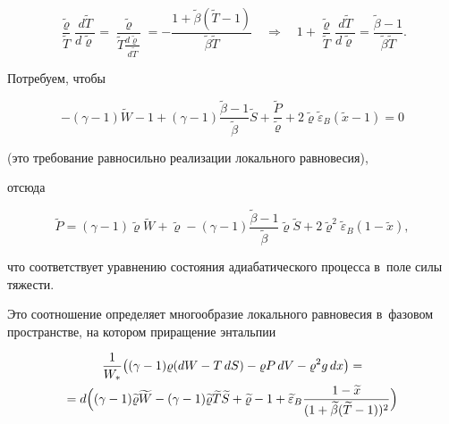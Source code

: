 $$

\frac{\widetilde{\varrho}}{\widetilde{T}}\frac{d\widetilde{T}}{d\widetilde{\varrho}}=

\frac{\widetilde{\varrho}}{\widetilde{T}\frac{d\widetilde{\varrho}}{d\widetilde{T}}}=

-\frac{1+\widetilde{\beta}(\widetilde{T}-1)}{\widetilde{\beta}\widetilde{T}}\quad 

\Rightarrow \quad 

1+\frac{\widetilde{\varrho}}{\widetilde{T}}\frac{d\widetilde{T}}{d\widetilde{\varrho}}=\frac{\widetilde{\beta}-1}{\widetilde{\beta}\widetilde{T}}.

$$

Потребуем, чтобы

\begin{equation}

-(\gamma-1)\widetilde{W}-1+(\gamma-1)\frac{\widetilde{\beta}-1}{\widetilde{\beta}}\widetilde{S} +\frac{\widetilde{P}}{\widetilde{\varrho}}+2\widetilde{\varrho} \widetilde{\varepsilon}_B

(\widetilde{x }-1 )=0

\label{lukashev:loeeq}

\end{equation}

(это требование равносильно реализации локального равновесия), 

отсюда

\begin{equation}

\widetilde{P}=(\gamma-1)\widetilde{\varrho}\widetilde{W}+\widetilde{\varrho}-

(\gamma-1)\frac{\widetilde{\beta}-1}{\widetilde{\beta}} \widetilde{\varrho}

\widetilde{S} +2\widetilde{\varrho}^2 \widetilde{\varepsilon}_B (1-\widetilde{x}),

\label{lukashev:2}

\end{equation}

что соответствует уравнению состояния адиабатического процесса в~поле силы тяжести.

Это соотношение определяет многообразие локального равновесия в~фазовом пространстве, на котором приращение энтальпии

\begin{multline}

\label{lukashev:1H}

\frac1{W_*}

\bigl(

(\gamma-1)\varrho (dW-T\,dS)-\varrho P \,dV-\varrho^2 g \,dx

\bigr)=\\

=d\Bigl(

(\gamma-1)\widetilde{\varrho}\widetilde{W}-

(\gamma-1)\widetilde{\varrho} \widetilde{T}\widetilde{S}+

\widetilde{\varrho}-1+\widetilde{\varepsilon}_B \frac{1- \widetilde{x}}{(1+\widetilde{\beta}(\widetilde{T}-1))^2} 

\Bigr)

\end{multline}

